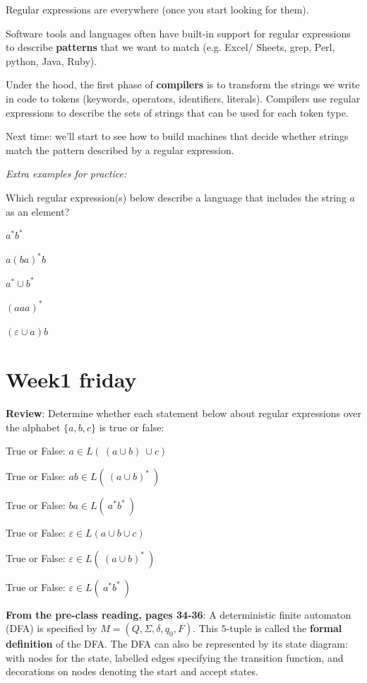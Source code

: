 \documentclass[12pt, oneside]{article}
\begin{document}
Regular expressions are everywhere (once you start looking for them).

Software tools and languages often have built-in support for regular expressions to describe
{\bf patterns} that we want to match (e.g. Excel/ Sheets, grep, Perl, python, Java, Ruby).

Under the hood, the first phase of {\bf compilers} is to transform the strings we write 
in code to tokens (keywords, operators, identifiers, literals). Compilers use regular expressions
to describe the sets of strings that can be used for each token type.

Next time: we'll start to see how to build machines that decide whether strings match the pattern
described by a regular expression.

\vfill


{\it Extra examples for practice:}

Which regular expression(s) below describe a language that includes the string $a$ as an element?

$a^* b^*$ 

\vfill

$a(ba)^* b$

\vfill

$a^* \cup b^*$

\vfill

$(aaa)^*$

\vfill

$(\varepsilon \cup a) b$

\vfill \vfill
\section*{Week1 friday}


{\bf Review}: Determine whether each statement below about regular expressions
over the alphabet $\{a,b,c\}$ is true or false:
   
True or False: \qquad 
   $a  \in L(~(a \cup b )~\cup c)$

True or False: \qquad 
   $ab  \in L(~ (a \cup b)^*  ~)$
   
True or False: \qquad    
   $ba \in L( ~ a^* b^* ~)$
   
True or False: \qquad 
   $\varepsilon  \in L(a \cup b \cup c)$
   
True or False: \qquad 
   $\varepsilon  \in L(~ (a \cup b)^*  ~)$

True or False: \qquad 
   $\varepsilon \in L( ~ a^* b^* ~)$


{\bf From the pre-class reading, pages 34-36}:
A deterministic finite automaton (DFA) is specified by  $M = (Q, \Sigma, \delta, q_0, F)$.
This $5$-tuple is called the {\bf formal definition} of the DFA. The DFA can also 
be represented by its state diagram: with nodes for the state, labelled edges specifying the 
transition function, and decorations on nodes denoting the start and accept states.
\end{document}
